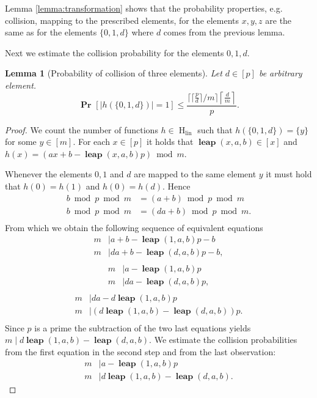 \documentclass{article}
\newcommand{\hlin}{\operatorname{H}_{\operatorname{lin}}}
\newcommand{\leap}[3]{\operatorname{\mathbf{leap}}({#1}, {#2}, {#3})}
\newcommand{\probs}[2]{\operatorname{\mathbf{Pr}}_{{#1}}\left[{#2}\right]}
\newcommand{\prob}[1]{\probs{}{#1}}
\newtheorem{lemma}{Lemma}
\begin{document}
Lemma \ref{lemma:transformation} shows that the probability properties, e.g. collision, mapping to the prescribed elements, for the elements $x, y, z$ are the same as for the elements $\{0, 1, d\}$ where $d$ comes from the previous lemma.

Next we estimate the collision probability for the elements $0, 1, d$.

\begin{lemma}[Probability of collision of three elements]
\label{lemma:probability-3-elements}
Let $d \in [p]$ be arbitrary element.
\[
\prob{|h(\{0, 1, d\})| = 1 } \leq \frac{\lceil \lceil\frac{p}{d}\rceil / m \rceil\left\lceil\frac{d}{m}\right\rceil}{p}.
\]
\end{lemma}
\begin{proof}
We count the number of functions $h \in \hlin$ such that $h(\{0, 1, d\}) = \{y\}$ for some $y \in [m]$.
For each $x \in [p]$ it holds that $\leap{x}{a}{b} \in [x]$ and $h(x) = (ax + b - \leap{x}{a}{b}p) \bmod m$.

Whenever the elements $0, 1$ and $d$ are mapped to the same element $y$ it must hold that $h(0) = h(1)$ and $h(0) = h(d)$. Hence
\begin{align*}
	b \bmod p \bmod m & = (a + b) \bmod p \bmod m \\
	b \bmod p \bmod m & = (da + b) \bmod p \bmod m. \\
\end{align*}
From which we obtain the following sequence of equivalent equations
\begin{align*}
	m & \mid a + b - \leap{1}{a}{b}p - b \\
	m & \mid da + b - \leap{d}{a}{b}p - b, \\
\end{align*}
\begin{align*}
	m & \mid a - \leap{1}{a}{b}p \\
	m & \mid da - \leap{d}{a}{b}p, \\
\end{align*}
\begin{align*}
	m & \mid da - d\leap{1}{a}{b}p \\
	m & \mid (d\leap{1}{a}{b} - \leap{d}{a}{b})p. \\
\end{align*}
Since $p$ is a prime the subtraction of the two last equations yields $m \mid d\leap{1}{a}{b} - \leap{d}{a}{b}$.
We estimate the collision probabilities from the first equation in the second step and from the last observation:
\begin{align}
	m & \mid a - \leap{1}{a}{b}p \label{3-prob-1-statement} \\
	m & \mid d\leap{1}{a}{b} - \leap{d}{a}{b}. \label{3-prob-2-statement}
\end{align}


\end{proof}
\end{document}
